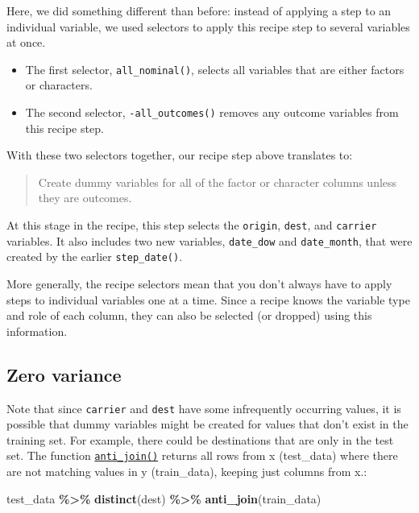 \documentclass[
]{book}
\newenvironment{Shaded}{\begin{snugshade}}{\end{snugshade}}
\newcommand{\KeywordTok}[1]{\textcolor[rgb]{0.13,0.29,0.53}{\textbf{#1}}}
\newcommand{\NormalTok}[1]{#1}
\newcommand{\OperatorTok}[1]{\textcolor[rgb]{0.81,0.36,0.00}{\textbf{#1}}}
\newcommand{\StringTok}[1]{\textcolor[rgb]{0.31,0.60,0.02}{#1}}
\begin{document}
Here, we did something different than before: instead of applying a step to an individual variable, we used selectors to apply this recipe step to several variables at once.

\begin{itemize}
\item
  The first selector, \texttt{all\_nominal()}, selects all variables that are either factors or characters.
\item
  The second selector, \texttt{-all\_outcomes()} removes any outcome variables from this recipe step.
\end{itemize}

With these two selectors together, our recipe step above translates to:

\begin{quote}
Create dummy variables for all of the factor or character columns unless they are outcomes.
\end{quote}

At this stage in the recipe, this step selects the \texttt{origin}, \texttt{dest}, and \texttt{carrier} variables. It also includes two new variables, \texttt{date\_dow} and \texttt{date\_month}, that were created by the earlier \texttt{step\_date()}.

More generally, the recipe selectors mean that you don't always have to apply steps to individual variables one at a time. Since a recipe knows the variable type and role of each column, they can also be selected (or dropped) using this information.

\hypertarget{zero-variance}{%
\subsection{Zero variance}\label{zero-variance}}

Note that since \texttt{carrier} and \texttt{dest} have some infrequently occurring values, it is possible that dummy variables might be created for values that don't exist in the training set. For example, there could be destinations that are only in the test set. The function \href{https://dplyr.tidyverse.org/reference/join.html}{\texttt{anti\_join()}} returns all rows from x (test\_data) where there are not matching values in y (train\_data), keeping just columns from x.:

\begin{Shaded}
\begin{Highlighting}[]
\NormalTok{test\_data }\OperatorTok{\%\textgreater{}\%}
\StringTok{  }\KeywordTok{distinct}\NormalTok{(dest) }\OperatorTok{\%\textgreater{}\%}
\StringTok{  }\KeywordTok{anti\_join}\NormalTok{(train\_data)}
\end{Highlighting}
\end{Shaded}
\end{document}
